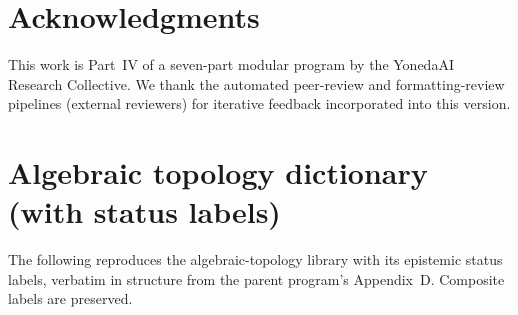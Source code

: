 \documentclass[12pt]{article}
\theoremstyle{definition}
\theoremstyle{remark}
\begin{document}
\section*{Acknowledgments}
This work is Part~IV of a seven-part modular program by the YonedaAI Research
Collective. We thank the automated peer-review and formatting-review pipelines
(external reviewers) for iterative feedback incorporated into this version.

\appendix
\section{Algebraic topology dictionary (with status labels)}
\label{sec:dict}

The following reproduces the algebraic-topology library with its epistemic status
labels, verbatim in structure from the parent program's Appendix~D. Composite
labels are preserved.
\end{document}
